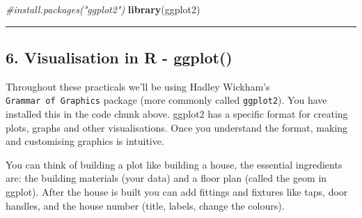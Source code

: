 \documentclass[]{article}
\newenvironment{Shaded}{\begin{snugshade}}{\end{snugshade}}
\newcommand{\CommentTok}[1]{\textcolor[rgb]{0.56,0.35,0.01}{\textit{#1}}}
\newcommand{\KeywordTok}[1]{\textcolor[rgb]{0.13,0.29,0.53}{\textbf{#1}}}
\newcommand{\NormalTok}[1]{#1}
\begin{document}
\begin{Shaded}
\begin{Highlighting}[]
\CommentTok{#install.packages("ggplot2")}
\KeywordTok{library}\NormalTok{(ggplot2)}
\end{Highlighting}
\end{Shaded}

\begin{center}\rule{0.5\linewidth}{\linethickness}\end{center}

\hypertarget{visualisation-in-r---ggplot}{%
\subsection{6. Visualisation in R -
ggplot()}\label{visualisation-in-r---ggplot}}

Throughout these practicals we'll be using Hadley Wickham's
\texttt{Grammar\ of\ Graphics} package (more commonly called
\texttt{ggplot2}). You have installed this in the code chunk above.
ggplot2 has a specific format for creating plots, graphs and other
visualisations. Once you understand the format, making and customising
graphics is intuitive.

You can think of building a plot like building a house, the essential
ingredients are: the building materials (your data) and a floor plan
(called the geom in ggplot). After the house is built you can add
fittings and fixtures like taps, door handles, and the house number
(title, labels, change the colours).
\end{document}
